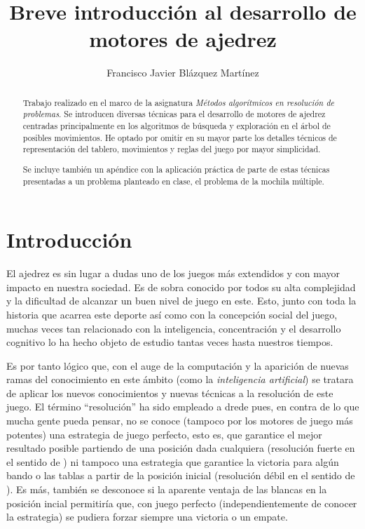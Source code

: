 \documentclass[letterpaper,12pt]{article}
\begin{document}
\title{\bf{Breve introducción al desarrollo de motores de ajedrez}}
\author{Francisco Javier Blázquez Martínez}
\date{}
\maketitle

\begin{abstract}

Trabajo realizado en el marco de la asignatura \textit{Métodos algorítmicos 
en resolución de problemas}. Se introducen diversas técnicas para el desarrollo
de motores de ajedrez centradas principalmente en los algoritmos de búsqueda
y exploración en el árbol de posibles movimientos. He optado por omitir en su 
mayor parte los detalles técnicos de representación del tablero, movimientos y 
reglas del juego por mayor simplicidad.

Se incluye también un apéndice con la aplicación práctica de parte de estas técnicas
presentadas a un problema planteado en clase, el problema de la mochila múltiple.

\end{abstract}

\section{Introducción}

El ajedrez es sin lugar a dudas uno de los juegos más extendidos y con mayor 
impacto en nuestra sociedad. Es de sobra conocido por todos su alta complejidad 
y la dificultad de alcanzar un buen nivel de juego en este. Esto, junto con toda
la historia que acarrea este deporte así como con la concepción social del juego,
muchas veces tan relacionado con la inteligencia, concentración y el desarrollo 
cognitivo lo ha hecho objeto de estudio tantas veces hasta nuestros tiempos.

Es por tanto lógico que, con el auge de la computación y la aparición de nuevas
ramas del conocimiento en este ámbito (como la \textit{inteligencia artificial})
se tratara de aplicar los nuevos conocimientos y nuevas técnicas a la resolución
de este juego. El término ``resolución'' ha sido empleado a drede pues, en contra
de lo que mucha gente pueda pensar, no se conoce (tampoco por los motores de juego
más potentes) una estrategia de juego perfecto, esto es, que garantice el mejor
resultado posible partiendo de una posición dada cualquiera (resolución fuerte 
en el sentido de \cite{Checkers is solved}) ni tampoco una estrategia que garantice
la victoria para algún bando o las tablas a partir de la posición inicial (resolución
débil en el sentido de \cite{Checkers is solved}). Es más, también se desconoce 
si la aparente ventaja de las blancas en la posición incial permitiría que, con
juego perfecto (independientemente de conocer la estrategia) se pudiera forzar 
siempre una victoria o un empate. 
\end{document}
